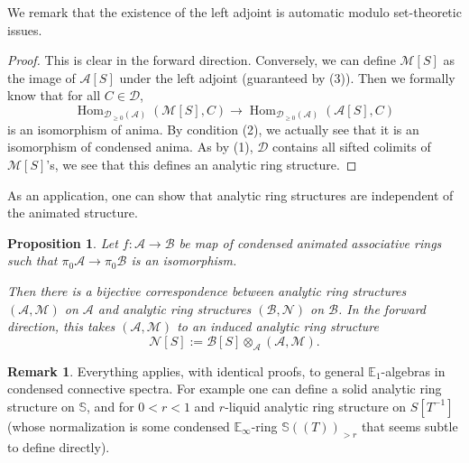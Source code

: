 \documentclass[11pt]{amsbook}
\DeclareMathOperator{\Hom}{Hom}
\numberwithin{equation}{section}
\numberwithin{theorem}{section}
\newtheorem{proposition}[theorem]{Proposition}
\theoremstyle{definition}
\newtheorem{remark}[theorem]{Remark}
\begin{document}
We remark that the existence of the left adjoint is automatic modulo set-theoretic issues.

\begin{proof} This is clear in the forward direction. Conversely, we can define $\mathcal M[S]$ as the image of $\mathcal A[S]$ under the left adjoint (guaranteed by (3)). Then we formally know that for all $C\in \mathcal D$,
\[
\Hom_{\mathcal D_{\geq 0}(\mathcal A)}(\mathcal M[S],C)\to \Hom_{\mathcal D_{\geq 0}(\mathcal A)}(\mathcal A[S],C)
\]
is an isomorphism of anima. By condition (2), we actually see that it is an isomorphism of condensed anima. As by (1), $\mathcal D$ contains all sifted colimits of $\mathcal M[S]$'s, we see that this defines an analytic ring structure.
\end{proof}

As an application, one can show that analytic ring structures are independent of the animated structure.

\begin{proposition}\label{prop:pi0invariance} Let $f: \mathcal A\to \mathcal B$ be map of condensed animated associative rings such that $\pi_0 \mathcal A\to \pi_0 \mathcal B$ is an isomorphism.

Then there is a bijective correspondence between analytic ring structures $(\mathcal A,\mathcal M)$ on $\mathcal A$ and analytic ring structures $(\mathcal B,\mathcal N)$ on $\mathcal B$. In the forward direction, this takes $(\mathcal A,\mathcal M)$ to an induced analytic ring structure
\[
\mathcal N[S] := \mathcal B[S]\otimes_{\mathcal A} (\mathcal A,\mathcal M).
\]
\end{proposition}

\begin{remark} Everything applies, with identical proofs, to general $\mathbb E_1$-algebras in condensed connective spectra. For example one can define a solid analytic ring structure on $\mathbb S$, and for $0<r<1$ and $r$-liquid analytic ring structure on $S[T^{-1}]$ (whose normalization is some condensed $\mathbb E_\infty$-ring $\mathbb S((T))_{>r}$ that seems subtle to define directly).
\end{remark}
\end{document}
